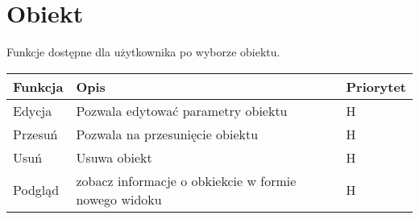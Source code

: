 \newpage
\section{Obiekt}
Funkcje dostępne dla użytkownika po wyborze obiektu.
\begin{table}[H]
    \begin{center}
    \label{tab:table}
    \begin{tabularx}{1.1\textwidth} { 
    >{\raggedright\arraybackslash}X 
    | >{\raggedright\arraybackslash}X 
    | >{\raggedleft\arraybackslash}X}
    \textbf{Funkcja} & \textbf{Opis} & \textbf{Priorytet}\\
    \hline
    Edycja&Pozwala edytować parametry obiektu&H\\
    \hline
    Przesuń&Pozwala na przesunięcie obiektu&H\\
    \hline
    Usuń&Usuwa obiekt&H\\
    \hline
    Podgląd&zobacz informacje o obkiekcie w formie nowego widoku&H\\
    \hline
    \end{tabularx}
    \end{center}
    \end{table}
